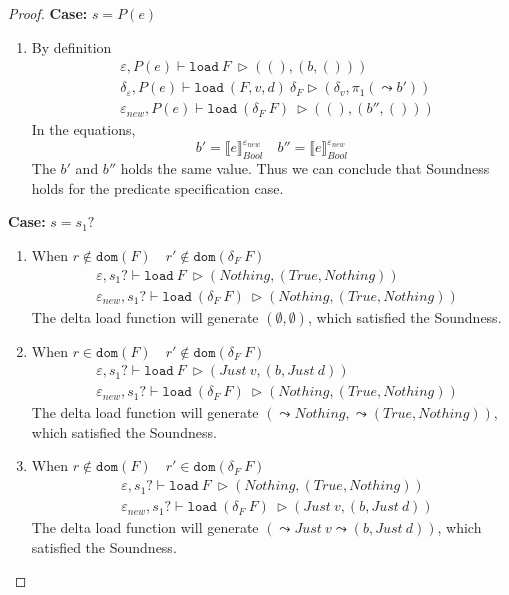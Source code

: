 \documentclass[10pt,twoside,a4paper]{article}
\theoremstyle{theorem}
\theoremstyle{lemma}
\theoremstyle{property}
\theoremstyle{definition}
\theoremstyle{assumption}
\def\fst{\pi_1}
\begin{document}
\begin{proof}
	\textbf{Case: } $s = P(e)$\\
	\begin{enumerate}
	\item
	By definition
	\begin{align*}
		& \varepsilon, P(e) \vdash \mathtt{load}~ F~ \rhd ((),(b,()))\\
		& \delta_\varepsilon, P(e) \vdash \mathtt{load}~ (F,v,d)~ \delta_F \rhd (\delta_v, \fst(\leadsto b'))\\
		& \varepsilon_{new}, P(e) \vdash \mathtt{load}~ (\delta_F~F)~ \rhd ((),(b'',()))
	\end{align*}
	In the equations, 
	\begin{displaymath}
		b' = \llbracket e \rrbracket^{\varepsilon_{new}}_{Bool} \quad b'' = \llbracket e \rrbracket^{\varepsilon_{new}}_{Bool}
	\end{displaymath}
	The $b'$ and $b''$ holds the same value. Thus we can conclude that Soundness holds for the predicate specification case.
	\end{enumerate}

	\textbf{Case: } $s = s_1?$\\
	\begin{enumerate}
	\item
	When $r \notin \mathtt{dom}(F) \quad r' \notin \mathtt{dom}(\delta_F~F)$
	\begin{align*}
		& \varepsilon, s_1? \vdash \mathtt{load}~ F~ \rhd (Nothing,(True, Nothing))\\
		& \varepsilon_{new}, s_1? \vdash \mathtt{load}~ (\delta_F~F)~ \rhd (Nothing,(True, Nothing))
	\end{align*}
	The delta load function will generate $(\emptyset, \emptyset)$, which satisfied the Soundness.

	\item
	When $r \in \mathtt{dom}(F) \quad r' \notin \mathtt{dom}(\delta_F~F)$
	\begin{align*}
		& \varepsilon, s_1? \vdash \mathtt{load}~ F~ \rhd (Just ~v, (b, Just ~d))\\
		& \varepsilon_{new}, s_1? \vdash \mathtt{load}~ (\delta_F~F)~ \rhd (Nothing,(True, Nothing))
	\end{align*}
	The delta load function will generate $(\leadsto Nothing, \leadsto (True, Nothing))$, which satisfied the Soundness.

	\item
	When $r \notin \mathtt{dom}(F) \quad r' \in \mathtt{dom}(\delta_F~F)$
	\begin{align*}
		& \varepsilon, s_1? \vdash \mathtt{load}~ F~ \rhd (Nothing,(True, Nothing))\\
		& \varepsilon_{new}, s_1? \vdash \mathtt{load}~ (\delta_F~F)~ \rhd (Just ~v, (b, Just ~d))
	\end{align*}
	The delta load function will generate $(\leadsto Just ~v \leadsto (b, Just ~d))$, which satisfied the Soundness.


\end{enumerate}
\end{proof}
\end{document}
